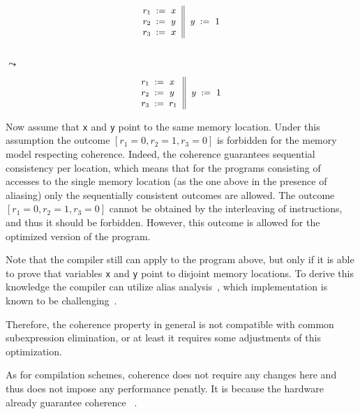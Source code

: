 \begin{minipage}{0.45\linewidth}
\begin{equation*}
\small
\inarrII{
  \readInst{}{r_1}{x}      \\
  \readInst{}{r_2}{y}      \\
  \readInst{}{r_3}{x}      \\
}{
  \writeInst{}{y}{1}       \\
}
\label{ex:coh-rr}
\end{equation*}
\end{minipage}\hfill%
\begin{minipage}{0.05\linewidth}
\Large~\\ $\leadsto$
\end{minipage}\hfill%
\begin{minipage}{0.45\linewidth}
\begin{equation*}
\small
\inarrII{
  \readInst{}{r_1}{x}      \\
  \readInst{}{r_2}{y}      \\
  \assignInst{r_3}{r_1}    \\
}{
  \writeInst{}{y}{1}       \\
}
\label{ex:coh-rr}
\end{equation*}
\end{minipage}

Now assume that \texttt{x} and \texttt{y} point to the same memory location.
Under this assumption the outcome $[r_1=0, r_2=1, r_3=0]$
is forbidden for the memory model respecting coherence.
Indeed, the coherence guarantees sequential consistency per location, 
which means that for the programs consisting of accesses 
to the single memory location 
(as the one above in the presence of aliasing) 
only the sequentially consistent outcomes are allowed.
The outcome $[r_1=0, r_2=1, r_3=0]$ cannot be obtained 
by the interleaving of instructions, and thus 
it should be forbidden.  
However, this outcome is allowed for 
the optimized version of the program. 

Note that the compiler still can apply \CSE to the program above, 
but only if it is able to prove that variables \texttt{x} and \texttt{y} 
point to disjoint memory locations. 
To derive this knowledge the compiler can utilize alias analysis~\cite{?},
which implementation is known to be challenging~\cite{?}.

Therefore, the coherence property in general is not compatible 
with common subexpression elimination, or at least 
it requires some adjustments of this optimization.

As for compilation schemes, coherence does not require 
any changes here and thus does not impose any performance penatly.
It is because the hardware already guarantee coherence%
~\cite{Alglave-al:TOPLAS14, Sarkar-al:PLDI11, Sewell-al:CACM10, Lahav-al:PLDI17}. 
